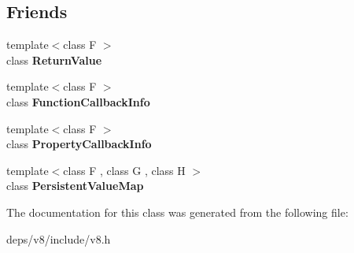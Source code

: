 \subsection*{Friends}
\begin{DoxyCompactItemize}
\item 
\hypertarget{classv8_1_1_return_value_a53f604d3d6f2dc0647df33c9979f116a}{}{\footnotesize template$<$class F $>$ }\\class {\bfseries Return\+Value}\label{classv8_1_1_return_value_a53f604d3d6f2dc0647df33c9979f116a}

\item 
\hypertarget{classv8_1_1_return_value_a76786e6fa2d0eac5e2d4f647659d0d23}{}{\footnotesize template$<$class F $>$ }\\class {\bfseries Function\+Callback\+Info}\label{classv8_1_1_return_value_a76786e6fa2d0eac5e2d4f647659d0d23}

\item 
\hypertarget{classv8_1_1_return_value_a5018adab21fade2b42f4f60e45fa1083}{}{\footnotesize template$<$class F $>$ }\\class {\bfseries Property\+Callback\+Info}\label{classv8_1_1_return_value_a5018adab21fade2b42f4f60e45fa1083}

\item 
\hypertarget{classv8_1_1_return_value_a401e5cd2db49a67497042617f01fdbc2}{}{\footnotesize template$<$class F , class G , class H $>$ }\\class {\bfseries Persistent\+Value\+Map}\label{classv8_1_1_return_value_a401e5cd2db49a67497042617f01fdbc2}

\end{DoxyCompactItemize}


The documentation for this class was generated from the following file\+:\begin{DoxyCompactItemize}
\item 
deps/v8/include/v8.\+h\end{DoxyCompactItemize}

